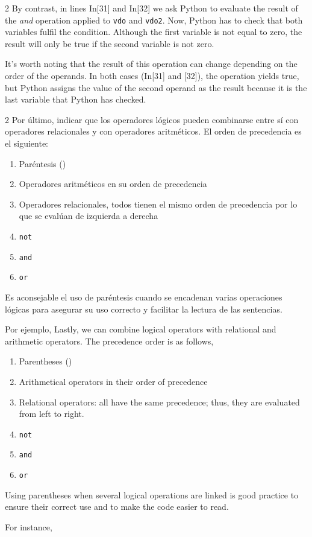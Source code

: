 \begin{paracol}{2}
By contrast, in lines In[31] and In[32] we ask Python to evaluate the result of the \emph{and} operation applied to \texttt{vdo} and \texttt{vdo2}. Now, Python has to check that both variables fulfil the condition. Although the first variable is not equal to zero, the result will only be true if the second variable is not zero.

It's worth noting that the result of this operation can change depending on the order of the operands. In both cases (In[31] and [32]), the operation yields true, but Python assigns the value of the second operand as the result because it is the last variable that Python has checked.
\end{paracol}

\begin{paracol}{2}
Por último, indicar que los operadores lógicos pueden combinarse entre sí con operadores relacionales y con operadores aritméticos. El orden de precedencia es el siguiente:
\begin{enumerate}
\item  Paréntesis ()
\item  Operadores aritméticos en su orden de precedencia
\item  Operadores relacionales, todos tienen el mismo orden de precedencia por lo que se evalúan de izquierda a derecha
\item \texttt{not}
\item \texttt{and}
\item \texttt{or}
\end{enumerate}

Es aconsejable el uso de paréntesis cuando se encadenan varias operaciones lógicas para asegurar su uso correcto y facilitar la lectura de las sentencias.

Por ejemplo,
\switchcolumn
Lastly, we can combine logical operators with relational and arithmetic operators. The precedence order is as follows,
\begin{enumerate}
\item  Parentheses ()
\item  Arithmetical operators in their order of precedence
\item  Relational operators: all have the same precedence; thus, they are evaluated from left to right.
\item \texttt{not}
\item \texttt{and}
\item \texttt{or}
\end{enumerate}

Using parentheses when several logical operations are linked is good practice to ensure their correct use and to make the code easier to read.

For instance,
\end{paracol} 
